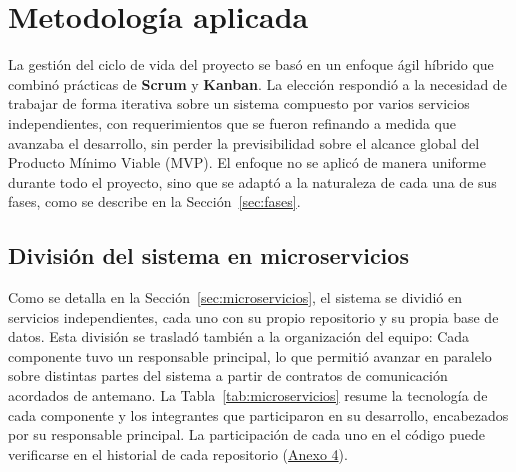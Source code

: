 \section{Metodología aplicada}\label{sec:metodologia}

La gestión del ciclo de vida del proyecto se basó en un enfoque ágil híbrido que combinó prácticas de \textbf{Scrum} y \textbf{Kanban}. La elección respondió a la necesidad de trabajar de forma iterativa sobre un sistema compuesto por varios servicios independientes, con requerimientos que se fueron refinando a medida que avanzaba el desarrollo, sin perder la previsibilidad sobre el alcance global del Producto Mínimo Viable (MVP). El enfoque no se aplicó de manera uniforme durante todo el proyecto, sino que se adaptó a la naturaleza de cada una de sus fases, como se describe en la Sección~\ref{sec:fases}.

\subsection{División del sistema en microservicios}\label{sec:division_microservicios}

Como se detalla en la Sección~\ref{sec:microservicios}, el sistema se dividió en servicios independientes, cada uno con su propio repositorio y su propia base de datos. Esta división se trasladó también a la organización del equipo: Cada componente tuvo un responsable principal, lo que permitió avanzar en paralelo sobre distintas partes del sistema a partir de contratos de comunicación acordados de antemano. La Tabla~\ref{tab:microservicios} resume la tecnología de cada componente y los integrantes que participaron en su desarrollo, encabezados por su responsable principal. La participación de cada uno en el código puede verificarse en el historial de cada repositorio (\hyperref[anexo:repositorios]{Anexo 4}).

